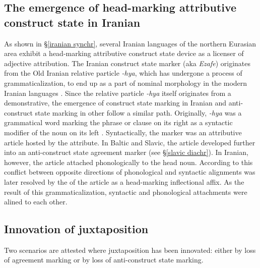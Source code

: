 {\subsection[Head-marking attributive construct state]{The emergence of head-marking attributive construct state in Iranian}\label{iranian diachr}
As shown in \S\ref{iranian synchr}, several Iranian languages of the northern Eurasian area exhibit a head-marking attributive construct state device as a licenser of adjective attribution. The Iranian construct state marker (aka \textit{Ezafe}) originates from the Old Iranian relative particle \textit{-hya}, which has undergone a process of grammaticalization, to end up as a part of nominal morphology in the modern Iranian languages \citep{haider-etal1984,samvelian2007b}. Since the  relative particle \textit{-hya} itself originates from a demonstrative, the emergence of construct state marking in Iranian and anti\hyp{}construct state marking in other  follow a similar path. Originally, \textit{-hya} was a grammatical word marking the phrase or clause on its right as a syntactic modifier of the noun on its left \citep{haider-etal1984}. Syntactically, the marker was an attributive article hosted by the attribute. In Baltic and Slavic, the article developed further into an anti\hyp{}construct state agreement marker (see \S\ref{slavic diachr}). In Iranian, however, the article attached phonologically to the head noun. According to \citet[3]{samvelian2007} this conflict between opposite directions of phonological and syntactic alignments was later resolved by the  of the article as a head-marking inflectional affix. As the result of this grammaticalization, syntactic and phonological attachments were alined to each other.

\subsection[Innovation of juxtaposition]{Innovation of juxtaposition}
Two scenarios are attested where juxtaposition has been innovated: either by loss of agreement marking or by loss of anti\hyp{}construct state marking.

}
